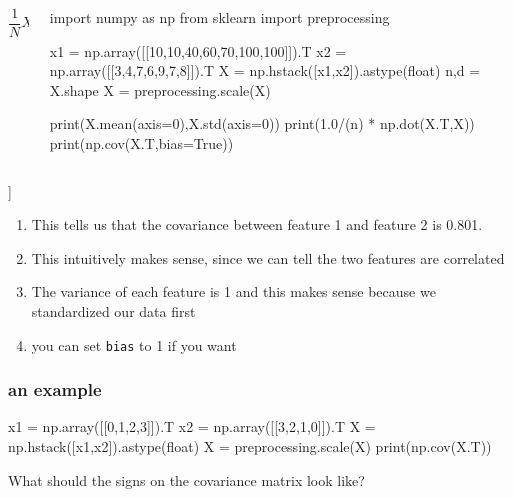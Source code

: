 \documentclass[table,dvipsnames]{beamer}
\begin{document}
\begin{frame}[fragile]
\footnotesize
\begin{columns}
\begin{column}{3cm}
\begin{equation*}
 \frac{1}{N} X^{T}X
\end{equation*}
\end{column}
\begin{column}{7cm}
 \begin{code}
import numpy as np
from sklearn import preprocessing

x1 =  np.array([[10,10,40,60,70,100,100]]).T
x2 =  np.array([[3,4,7,6,9,7,8]]).T
X = np.hstack([x1,x2]).astype(float)
n,d = X.shape
X = preprocessing.scale(X)

print(X.mean(axis=0),X.std(axis=0))
print(1.0/(n) * np.dot(X.T,X))
print(np.cov(X.T,bias=True))
 \end{code}
\end{column}
\end{columns}

\begin{codeout}
 [[ 1.          0.80138769]
 [ 0.80138769  1.        ]]
\end{codeout}

\begin{enumerate}
\scriptsize
 \item This tells us that the covariance between feature 1 and feature 2 is 0.801. 
 \item This intuitively makes sense, since we can tell the two features are correlated
 \item The variance of each feature is 1 and this makes sense because we standardized our data first
 \item you can set \texttt{bias} to 1 if you want 
\end{enumerate}
\end{frame}

\begin{frame}[fragile]
\frametitle{an example}
\footnotesize
\begin{code}
x1 =  np.array([[0,1,2,3]]).T
x2 =  np.array([[3,2,1,0]]).T
X = np.hstack([x1,x2]).astype(float)
X = preprocessing.scale(X)
print(np.cov(X.T))
\end{code}
What should the signs on the covariance matrix look like?
\end{frame}
\end{document}
